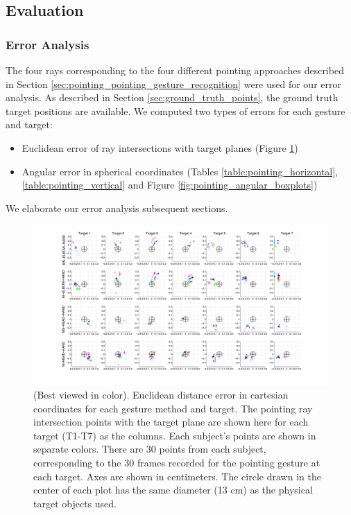 \subsection{Evaluation}
\label{sec:pointing_evaluation}


\subsubsection{Error Analysis}
\label{sec:pointing_error_analysis}

The four rays corresponding to the four different pointing approaches described in Section \ref{sec:pointing_pointing_gesture_recognition} were used for our error analysis.  As described in Section \ref{sec:ground_truth_points}, the ground truth target positions are available. We computed two types of errors for each gesture and target:

\begin{itemize}
\item Euclidean error of ray intersections with target planes (Figure \ref{fig:euclidean_projections})
\item Angular error in spherical coordinates (Tables \ref{table:pointing_horizontal}, \ref{table:pointing_vertical} and Figure \ref{fig:pointing_angular_boxplots})
\end{itemize}

We elaborate our error analysis subsequent sections.

\begin{landscape}
\begin{figure}[t!]
\centering
\vspace*{-1.0cm}\includegraphics[width=1.5\textwidth]{pics/projections.pdf}
\caption{(Best viewed in color). Euclidean distance error in cartesian coordinates for each gesture method and target. The pointing ray intersection points with the target plane are shown here for each target (T1-T7) as the columns.  Each subject's points are shown in separate colors.  There are 30 points from each subject, corresponding to the 30 frames recorded for the pointing gesture at each target.  Axes are shown in centimeters.  The circle drawn in the center of each plot has the same diameter (13 cm) as the physical target objects used.}
\label{fig:euclidean_projections}
\end{figure}
\end{landscape}

